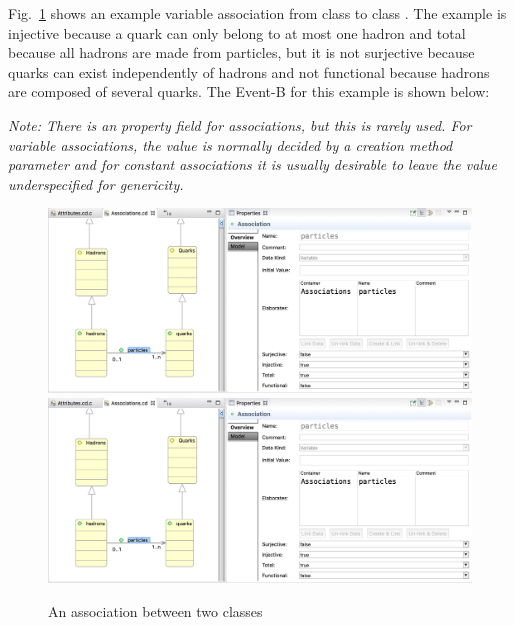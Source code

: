 Fig.~\ref{fig:ClassAssociations} shows an example variable association  from class  to class .
The example is injective because a quark can only belong to at most one hadron and total because all hadrons are made from particles, but it is not surjective because quarks can exist independently of hadrons and not functional because hadrons are composed of several quarks.
The Event-B for this example is shown below:
\END

\emph{Note: There is an}  \emph{property field for associations, but this is rarely used. For variable associations, the value is normally decided by a creation method parameter and for constant associations it is usually desirable to leave the value underspecified for genericity.}

\begin{figure}[!htbp]
	\centering
	\ifplastex
	\includegraphics[width=1000]{figures/ClassAssociations.png}
	\else
	\includegraphics[width=1\textwidth]{figures/ClassAssociations.png}
	\fi
	\caption{An association between two classes}
	\label{fig:ClassAssociations}
\end{figure}